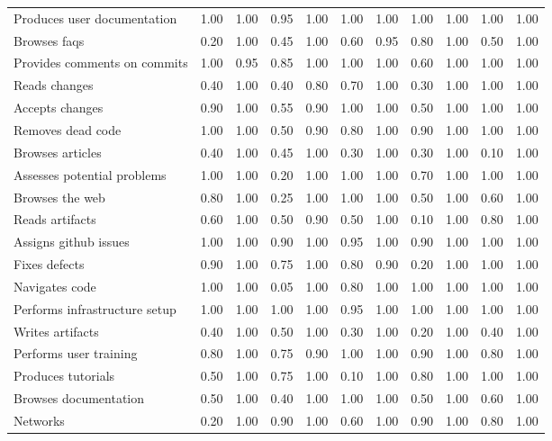 \begin{tabular}{lrrrrrrrrrr}
Produces user documentation & 1.00 & 1.00 & 0.95 & 1.00 & 1.00 & 1.00 & 1.00 & 1.00 & 1.00 & 1.00 \\
Browses faqs & 0.20 & 1.00 & 0.45 & 1.00 & 0.60 & 0.95 & 0.80 & 1.00 & 0.50 & 1.00 \\
Provides comments on commits & 1.00 & 0.95 & 0.85 & 1.00 & 1.00 & 1.00 & 0.60 & 1.00 & 1.00 & 1.00 \\
Reads changes & 0.40 & 1.00 & 0.40 & 0.80 & 0.70 & 1.00 & 0.30 & 1.00 & 1.00 & 1.00 \\
Accepts changes & 0.90 & 1.00 & 0.55 & 0.90 & 1.00 & 1.00 & 0.50 & 1.00 & 1.00 & 1.00 \\
Removes dead code & 1.00 & 1.00 & 0.50 & 0.90 & 0.80 & 1.00 & 0.90 & 1.00 & 1.00 & 1.00 \\
Browses articles & 0.40 & 1.00 & 0.45 & 1.00 & 0.30 & 1.00 & 0.30 & 1.00 & 0.10 & 1.00 \\
Assesses potential problems & 1.00 & 1.00 & 0.20 & 1.00 & 1.00 & 1.00 & 0.70 & 1.00 & 1.00 & 1.00 \\
Browses the web & 0.80 & 1.00 & 0.25 & 1.00 & 1.00 & 1.00 & 0.50 & 1.00 & 0.60 & 1.00 \\
Reads artifacts & 0.60 & 1.00 & 0.50 & 0.90 & 0.50 & 1.00 & 0.10 & 1.00 & 0.80 & 1.00 \\
Assigns github issues & 1.00 & 1.00 & 0.90 & 1.00 & 0.95 & 1.00 & 0.90 & 1.00 & 1.00 & 1.00 \\
Fixes defects & 0.90 & 1.00 & 0.75 & 1.00 & 0.80 & 0.90 & 0.20 & 1.00 & 1.00 & 1.00 \\
Navigates code & 1.00 & 1.00 & 0.05 & 1.00 & 0.80 & 1.00 & 1.00 & 1.00 & 1.00 & 1.00 \\
Performs infrastructure setup & 1.00 & 1.00 & 1.00 & 1.00 & 0.95 & 1.00 & 1.00 & 1.00 & 1.00 & 1.00 \\
Writes artifacts & 0.40 & 1.00 & 0.50 & 1.00 & 0.30 & 1.00 & 0.20 & 1.00 & 0.40 & 1.00 \\
Performs user training & 0.80 & 1.00 & 0.75 & 0.90 & 1.00 & 1.00 & 0.90 & 1.00 & 0.80 & 1.00 \\
Produces tutorials & 0.50 & 1.00 & 0.75 & 1.00 & 0.10 & 1.00 & 0.80 & 1.00 & 1.00 & 1.00 \\
Browses documentation & 0.50 & 1.00 & 0.40 & 1.00 & 1.00 & 1.00 & 0.50 & 1.00 & 0.60 & 1.00 \\
Networks & 0.20 & 1.00 & 0.90 & 1.00 & 0.60 & 1.00 & 0.90 & 1.00 & 0.80 & 1.00 \\
\bottomrule
\end{tabular}
